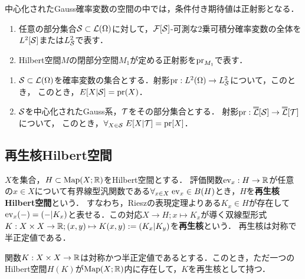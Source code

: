 \documentclass[uplatex,dvipdfmx]{jsreport}
\begin{document}
\begin{tcolorbox}[colframe=ForestGreen, colback=ForestGreen!10!white,breakable,colbacktitle=ForestGreen!40!white,coltitle=black,fonttitle=\bfseries\sffamily,
title=]
    中心化されたGauss確率変数の空間の中では，条件付き期待値は正射影となる．
\end{tcolorbox}

\begin{notation}\mbox{}
    \begin{enumerate}
        \item 任意の部分集合$\S\subset\L(\Om)$に対して，$\F[\S]$-可測な2乗可積分確率変数の全体を$L^2[\S]$または$L^2_\S$で表す．
        \item Hilbert空間$M$の閉部分空間$M_1$が定める正射影を$\pr_{M_1}$で表す．
    \end{enumerate}
\end{notation}

\begin{theorem}[正射影としての条件付き期待値]\mbox{}
    \begin{enumerate}
        \item $\S\subset\L(\Om)$を確率変数の集合とする．射影$\pr:L^2(\Om)\to L^2_\S$について，このとき，
        このとき，$E[X|\S]=\pr(X)$．
        \item $\S$を中心化されたGauss系，$\cT$をその部分集合とする．
        射影$\pr:\oo{\L}[\S]\to\oo{\L}[\cT]$について，
        このとき，$\forall_{X\in\S}\;E[X|\cT]=\pr[X]$．
    \end{enumerate}
\end{theorem}

\subsection{再生核Hilbert空間}

\begin{definition}
    $X$を集合，$H\subset\Map(X;\R)$をHilbert空間とする．
    評価関数$\ev_x:H\to\R$が任意の$x\in X$について有界線型汎関数である$\forall_{x\in X}\;\ev_x\in B(H)$とき，$H$を\textbf{再生核Hilbert空間}という．
    すなわち，Rieszの表現定理よりある$K_x\in H$が存在して$\ev_x(-)=(-|K_x)$と表せる．この対応$X\to H;x\mapsto K_x$が導く双線型形式$K:X\times X\to\R;(x,y)\mapsto K(x,y):=(K_x|K_y)$を\textbf{再生核}という．
    再生核は対称で半正定値である．
\end{definition}
\begin{theorem}
    関数$K:X\times X\to\R$は対称かつ半正定値であるとする．このとき，ただ一つのHilbert空間$H(K)$が$\Map(X;\R)$内に存在して，$K$を再生核として持つ．
\end{theorem}
\end{document}
